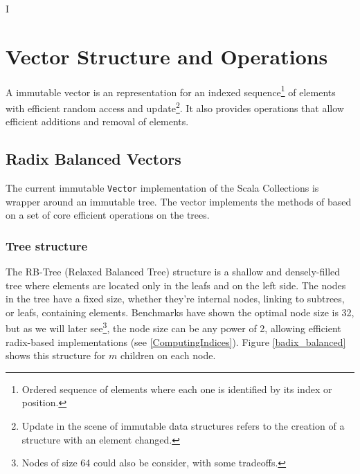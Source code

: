 I%

\chapter{Vector Structure and Operations} %

\label{VectorStructure} %



 A immutable vector is an representation for an indexed sequence\footnote{Ordered sequence of elements where each one is identified by its index or position.} of elements with efficient random access and update\footnote{Update in the scene of immutable data structures refers to the creation of a structure with an element changed.}. It also provides operations that allow efficient additions and removal of elements.
 
\section{Radix Balanced Vectors}
\label{RadixBalancedVectors}
The current immutable \texttt{Vector} implementation\cite{scalaVector211} of the Scala Collections is wrapper around an immutable tree. The vector implements the methods of based on a set of core efficient operations on the trees.


\subsection{Tree structure}
\label{RRBTreeStructure}
The RB-Tree (Relaxed Balanced Tree)  structure is a shallow and densely-filled tree where elements are located only in the leafs and on the left side. The nodes in the tree have a fixed size, whether they're internal nodes, linking to subtrees, or leafs, containing elements. Benchmarks have shown the optimal node size is 32, but as we will later see\footnote{Nodes of size 64 could also be consider, with some tradeoffs.}, the node size can be any power of 2, allowing efficient radix-based implementations (see \ref{ComputingIndices}). Figure \ref{badix_balanced} shows this structure for $m$ children on each node. 

